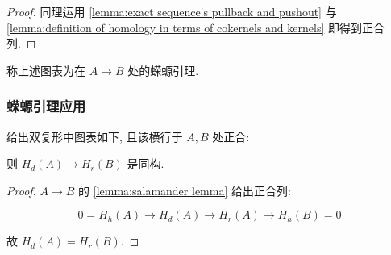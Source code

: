 \begin{lemma}[蝾螈引理]
\begin{proof}
        同理运用 \ref{lemma:exact sequence's pullback and pushout} 与 \ref{lemma:definition of homology in terms of cokernels and kernels} 即得到正合列.
    \end{proof}
\end{lemma}

称上述图表为在 \(A \to B\) 处的蝾螈引理.

\subsubsection{蝾螈引理应用}

\begin{corollary}
    给出双复形中图表如下, 且该横行于 \(A,B\) 处正合:

    \begin{center}
    \end{center}

    则 \(H_d (A) \to H_r (B)\) 是同构.

    \begin{proof}
        \(A \to B\) 的 \ref{lemma:salamander lemma} 给出正合列:

        \[
            0 = H_h (A) \to H_d (A) \to H_r (A) \to H_h (B) = 0
        \]

        故 \(H_d (A) = H_r (B)\).
    \end{proof}
\end{corollary}

